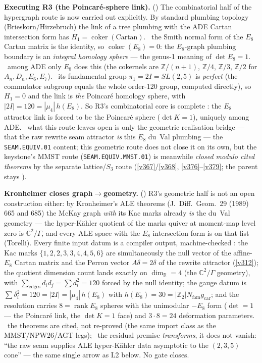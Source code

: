 \documentclass[11pt,a4paper]{article}
\newcommand{\gcar}{g_{\mathrm{car}}}
\newcommand{\Nfam}{N_{\mathrm{fam}}}
\newcommand{\Z}{\mathbb Z}
\begin{document}
\noindent\textbf{Executing R3 (the Poincar\'e-sphere link).}
()
The combinatorial half of the hypergraph route is now carried out explicitly. By standard plumbing topology
(Brieskorn/Hirzebruch) the link of a tree plumbing with the ADE Cartan intersection form has
$H_1=\operatorname{coker}(\mathrm{Cartan})$. \mE\ the Smith normal form of the $E_8$ Cartan matrix is the identity,
so $\operatorname{coker}(E_8)=0$: the $E_8$-graph plumbing boundary is an \emph{integral homology sphere} --- the
genus-1 meaning of $\det E_8{=}1$. \mE\ among ADE only $E_8$ does this (the cokernels are
$\Z/(n{+}1)$, $\Z/4$, $\Z/3$, $\Z/2$ for $A_n,D_n,E_6,E_7$). \mE\ its fundamental group $\pi_1=2I=SL(2,5)$ is
\emph{perfect} (the commutator subgroup equals the whole order-$120$ group, computed directly), so $H_1=0$ and the
link is \emph{the} Poincar\'e homology sphere, with $|2I|=120=|\mu_4|\,h(E_8)$. So R3's combinatorial core is
complete \mE: the $E_8$ attractor link is forced to be the Poincar\'e sphere ($\det K{=}1$), uniquely among ADE.
\mO\ what this route leaves open is only the geometric realisation bridge --- that the raw rewrite seam attractor
\emph{is} this $E_8$ du~Val plumbing --- the \texttt{SEAM.EQUIV.01} content; this geometric route does not close it
on its own, but the keystone's MMST route (\texttt{SEAM.EQUIV.MMST.01}) is meanwhile \emph{closed modulo cited
theorems} by the separate lattice/$S_3$ route
(\vref{v367}/\vref{v368}, \vref{v376}--\vref{v379}; the parent stays \mO).

\par\smallskip\noindent\textbf{Kronheimer closes graph$\to$geometry.}
()
R3's geometric half is not an open construction either: by Kronheimer's ALE theorems
(J.~Diff.~Geom.~29 (1989) 665 and 685) the McKay graph \emph{with} its Kac marks already \emph{is} the du~Val
geometry --- the hyper-K\"ahler quotient of the marks quiver at moment-map level zero is $\mathbb{C}^2/\Gamma$, and
every ALE space with the $E_8$ intersection form is on that list (Torelli). Every finite input datum is a
compiler output, machine-checked \mE: the Kac marks $\{1,2,2,3,3,4,4,5,6\}$ are simultaneously the null vector
of the affine-$E_8$ Cartan matrix and the Perron vector $A\delta{=}2\delta$ of the rewrite attractor
(\vref{v312}); the quotient dimension count lands exactly on $\dim_{\mathbb R}=4$ (the $\mathbb{C}^2/\Gamma$ geometry), with
$\sum_{\text{edges}}d_id_j{=}\sum d_i^2{=}120$ forced by the null identity; the gauge datum is
$\sum\delta_i^2{=}120{=}|2I|{=}|\mu_4|\,h(E_8)$ with $h(E_8){=}30{=}|\Z_2|\Nfam\gcar$; and the resolution carries
$8{=}\operatorname{rank}E_8$ spheres with the unimodular $-E_8$ form ($\det{=}1$ --- the Poincar\'e link, the
$\det K{=}1$ face) and $3\cdot8{=}24$ deformation parameters. \mC\ the theorems are cited, not re-proved (the
same import class as the MMST/NPW26/AGT legs); \mO\ the residual premise \emph{transforms}, it does not vanish:
``the raw seam supplies ALE hyper-K\"ahler data asymptotic to the $(2,3,5)$ cone'' --- the same single arrow as
L2 below. No gate closes.
\end{document}
